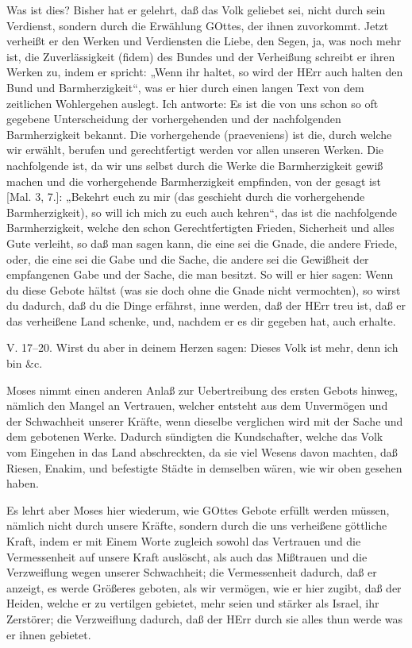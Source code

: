 Was ist dies? Bisher hat er gelehrt, daß das Volk geliebet sei, nicht durch sein Verdienst, sondern durch die Erwählung GOttes, der ihnen zuvorkommt. Jetzt verheißt er den Werken und Verdiensten die Liebe, den Segen, ja, was noch mehr ist, die Zuverlässigkeit (fidem) des Bundes und der Verheißung schreibt er ihren Werken zu, indem er spricht: „Wenn ihr haltet, so wird der HErr auch halten den Bund und Barmherzigkeit“, was er hier durch einen langen Text von dem zeitlichen Wohlergehen auslegt. Ich antworte: Es ist die von uns schon so oft gegebene Unterscheidung der vorhergehenden und der nachfolgenden Barmherzigkeit bekannt. Die vorhergehende (praeveniens) ist die, durch welche wir erwählt, berufen und gerechtfertigt werden vor allen unseren Werken. Die nachfolgende ist, da wir uns selbst durch die Werke die Barmherzigkeit gewiß machen und die vorhergehende Barmherzigkeit empfinden, von der gesagt ist [Mal. 3, 7.]: „Bekehrt euch zu mir (das geschieht durch die vorhergehende Barmherzigkeit), so will ich mich zu euch auch kehren“, das ist die nachfolgende Barmherzigkeit, welche den schon Gerechtfertigten Frieden, Sicherheit und alles Gute verleiht, so daß man sagen kann, die eine sei die Gnade, die andere Friede, oder, die eine sei die Gabe und die Sache, die andere sei die Gewißheit der empfangenen Gabe und der Sache, die man besitzt. So will er hier sagen: Wenn du diese Gebote hältst (was sie doch ohne die Gnade nicht vermochten), so wirst du dadurch, daß du die Dinge erfährst, inne werden, daß der HErr treu ist, daß er das verheißene Land schenke, und, nachdem er es dir gegeben hat, auch erhalte.

\begin{schriftzitat}
V. 17–20. Wirst du aber in deinem Herzen sagen: Dieses Volk ist mehr, denn ich bin \&c.
\end{schriftzitat}

Moses nimmt einen anderen Anlaß zur Uebertreibung des ersten Gebots hinweg, nämlich den Mangel an Vertrauen, welcher entsteht aus dem Unvermögen und der Schwachheit unserer Kräfte, wenn dieselbe verglichen wird mit der Sache und dem gebotenen Werke. Dadurch sündigten die Kundschafter, welche das Volk vom Eingehen in das Land abschreckten, da sie viel Wesens davon machten, daß Riesen, Enakim, und befestigte Städte in demselben wären, wie wir oben gesehen haben.

Es lehrt aber Moses hier wiederum, wie GOttes Gebote erfüllt werden müssen, nämlich nicht durch unsere Kräfte, sondern durch die uns verheißene göttliche Kraft, indem er mit Einem Worte zugleich sowohl das Vertrauen und die Vermessenheit auf unsere Kraft auslöscht, als auch das Mißtrauen und die Verzweiflung wegen unserer Schwachheit; die Vermessenheit dadurch, daß er anzeigt, es werde Größeres geboten, als wir vermögen, wie er hier zugibt, daß der Heiden, welche er zu vertilgen gebietet, mehr seien und stärker als Israel, ihr Zerstörer; die Verzweiflung dadurch, daß der HErr durch sie alles thun werde was er ihnen gebietet.

